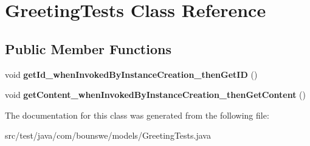 \hypertarget{class_greeting_tests}{}\section{Greeting\+Tests Class Reference}
\label{class_greeting_tests}
\subsection*{Public Member Functions}
\begin{DoxyCompactItemize}
\item 
\mbox{\label{class_greeting_tests_a31fc148e431a995e4563fbbdb8701b3b}} 
void {\bfseries get\+Id\+\_\+when\+Invoked\+By\+Instance\+Creation\+\_\+then\+Get\+ID} ()
\item 
\mbox{\label{class_greeting_tests_aa8e3946b3430b046b9b3ea5e92aaab22}} 
void {\bfseries get\+Content\+\_\+when\+Invoked\+By\+Instance\+Creation\+\_\+then\+Get\+Content} ()
\end{DoxyCompactItemize}


The documentation for this class was generated from the following file\+:\begin{DoxyCompactItemize}
\item 
src/test/java/com/bounswe/models/Greeting\+Tests.\+java\end{DoxyCompactItemize}

